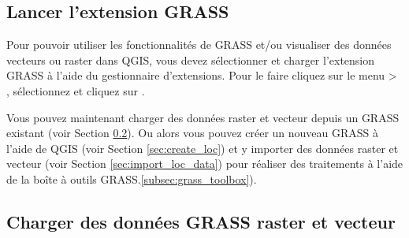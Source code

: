 \subsection{Lancer l'extension GRASS}\label{sec:starting_grass} 


Pour pouvoir utiliser les fonctionnalit\'es de GRASS et/ou visualiser des donn\'ees vecteurs ou raster dans QGIS, vous devez s\'electionner et charger l'extension GRASS \`a l'aide 
du gestionnaire d'extensions. Pour le faire cliquez sur le menu  > , s\'electionnez  et cliquez sur . 


Vous pouvez maintenant charger des donn\'ees raster et vecteur depuis un  GRASS existant (voir Section \ref{sec:load_grassdata}). Ou alors vous pouvez cr\'eer un nouveau  GRASS \`a l'aide de QGIS (voir Section \ref{sec:create_loc}) et y importer des donn\'ees raster et vecteur (voir Section \ref{sec:import_loc_data}) pour r\'ealiser des traitements \`a l'aide de la bo\^ite \`a outils GRASS.\ref{subsec:grass_toolbox}).


\subsection{Charger des donn\'ees GRASS raster et vecteur}\label{sec:load_grassdata} 

